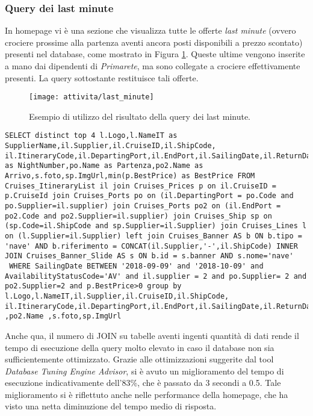 \subsubsection{Query dei last minute}
In homepage vi è una sezione che visualizza tutte le offerte \textit{last minute} (ovvero crociere prossime alla partenza aventi ancora posti disponibili a prezzo scontato) presenti nel database, come mostrato in Figura \ref{figura:query-2}. Queste ultime vengono inserite a mano dai dipendenti di \textit{Primarete}, ma sono collegate a crociere effettivamente presenti. La query sottostante restituisce tali offerte.
\begin{figure}[!h] 
	\centering 
	\texttt{[image: attivita/last\_minute]} 
	\caption{Esempio di utilizzo del risultato della query dei last minute.}
	\label{figura:query-2}
\end{figure}
\begin{lstlisting}
SELECT distinct top 4 l.Logo,l.NameIT as SupplierName,il.Supplier,il.CruiseID,il.ShipCode, il.ItineraryCode,il.DepartingPort,il.EndPort,il.SailingDate,il.ReturnDate,il.SailingLengthDays as NightNumber,po.Name as Partenza,po2.Name as Arrivo,s.foto,sp.ImgUrl,min(p.BestPrice) as BestPrice FROM Cruises_ItineraryList il join Cruises_Prices p on il.CruiseID = p.CruiseId join Cruises_Ports po on (il.DepartingPort = po.Code and po.Supplier=il.supplier) join Cruises_Ports po2 on (il.EndPort = po2.Code and po2.Supplier=il.supplier) join Cruises_Ship sp on (sp.Code=il.ShipCode and sp.Supplier=il.Supplier) join Cruises_Lines l on (l.Supplier=il.Supplier) left join Cruises_Banner AS b ON b.tipo = 'nave' AND b.riferimento = CONCAT(il.Supplier,'-',il.ShipCode) INNER JOIN Cruises_Banner_Slide AS s ON b.id = s.banner AND s.nome='nave'
 WHERE SailingDate BETWEEN '2018-09-09' and '2018-10-09' and AvailabilityStatusCode='AV' and il.supplier = 2 and po.Supplier= 2 and po2.Supplier=2 and p.BestPrice>0 group by l.Logo,l.NameIT,il.Supplier,il.CruiseID,il.ShipCode, il.ItineraryCode,il.DepartingPort,il.EndPort,il.SailingDate,il.ReturnDate,il.SailingLengthDays,po.Name ,po2.Name ,s.foto,sp.ImgUrl
\end{lstlisting}
Anche qua, il numero di JOIN su tabelle aventi ingenti quantità di dati rende il tempo di esecuzione della query molto elevato in caso il database non sia sufficientemente ottimizzato. Grazie alle ottimizzazioni suggerite dal tool \textit{Database Tuning Engine Advisor}, si è avuto un miglioramento del tempo di esecuzione indicativamente dell'83\%, che è passato da 3 secondi a 0.5. Tale miglioramento si è riflettuto anche nelle performance della homepage, che ha visto una netta diminuzione del tempo medio di risposta.


